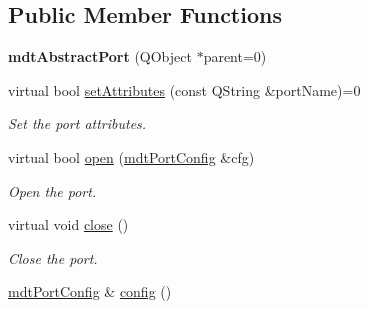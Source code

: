\subsection*{Public Member Functions}
\begin{DoxyCompactItemize}
\item 
\hypertarget{classmdt_abstract_port_a35e7bff9413690833c832bf115da102f}{
{\bfseries mdtAbstractPort} (QObject $\ast$parent=0)}
\label{classmdt_abstract_port_a35e7bff9413690833c832bf115da102f}

\item 
virtual bool \hyperlink{classmdt_abstract_port_af143cb0985d15c1c30da30cc7de206a7}{setAttributes} (const QString \&portName)=0
\begin{DoxyCompactList}\small\item\em Set the port attributes. \end{DoxyCompactList}\item 
virtual bool \hyperlink{classmdt_abstract_port_a4a8195c2bf580eb69ad5d90de86798e6}{open} (\hyperlink{classmdt_port_config}{mdtPortConfig} \&cfg)
\begin{DoxyCompactList}\small\item\em Open the port. \end{DoxyCompactList}\item 
virtual void \hyperlink{classmdt_abstract_port_a1ace1a2bd1a04f16952980e247b04800}{close} ()
\begin{DoxyCompactList}\small\item\em Close the port. \end{DoxyCompactList}\item 
\hypertarget{classmdt_abstract_port_a3d105c90696f7c40f29c24fe9b6e4481}{
\hyperlink{classmdt_port_config}{mdtPortConfig} \& \hyperlink{classmdt_abstract_port_a3d105c90696f7c40f29c24fe9b6e4481}{config} ()}
\label{classmdt_abstract_port_a3d105c90696f7c40f29c24fe9b6e4481}


\end{DoxyCompactItemize}
